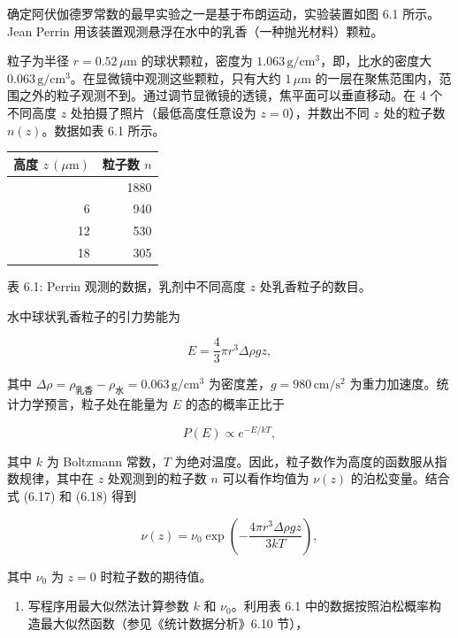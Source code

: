 \begin{question}
确定阿伏伽德罗常数的最早实验之一是基于布朗运动，实验装置如图 6.1
所示。Jean Perrin 用该装置观测悬浮在水中的乳香（一种抛光材料）颗粒。


粒子为半径 \(r=0.52\,\mu\mathrm{m}\) 的球状颗粒，密度为
\(1.063\,\mathrm{g/cm^3}\)，即，比水的密度大
\(0.063\,\mathrm{g/cm^3}\)。在显微镜中观测这些颗粒，只有大约
\(1\,\mu\mathrm{m}\)
的一层在聚焦范围内，范围之外的粒子观测不到。通过调节显微镜的透镜，焦平面可以垂直移动。在
4 个不同高度 \(z\) 处拍摄了照片（最低高度任意设为 \(z=0\)），并数出不同
\(z\) 处的粒子数 \(n(z)\)。数据如表 6.1 所示。

{%
\begin{longtable}[]{@{}rr@{}}
\toprule\noalign{}
高度 \(z\,(\mu\mathrm{m})\) & 粒子数 \(n\) \\
\midrule\noalign{}
\endhead
\bottomrule\noalign{}
\endlastfoot
0 & 1880 \\
6 & 940 \\
12 & 530 \\
18 & 305 \\
\end{longtable}
}

表 6.1: Perrin 观测的数据，乳剂中不同高度 \(z\) 处乳香粒子的数目。

水中球状乳香粒子的引力势能为

\[
E=\frac43\pi r^3\Delta\rho gz,
\]

其中 \(\Delta\rho=\rho_{\text{乳香}}-\rho_{\text{水}}=0.063\,\mathrm{g/cm^3}\)
为密度差，\(g=980\,\mathrm{cm/s^2}\)
为重力加速度。统计力学预言，粒子处在能量为 \(E\) 的态的概率正比于

\[
P(E)\propto e^{-E/kT},
\]

其中 \(k\) 为 Boltzmann 常数，\(T\)
为绝对温度。因此，粒子数作为高度的函数服从指数规律，其中在 \(z\)
处观测到的粒子数 \(n\) 可以看作均值为 \(\nu(z)\) 的泊松变量。结合式
(6.17) 和 (6.18) 得到

\[
\nu(z)=\nu_0\exp\left(-\frac{4\pi r^3\Delta\rho gz}{3kT}\right),
\]

其中 \(\nu_0\) 为 \(z=0\) 时粒子数的期待值。

\begin{enumerate}
\item
  写程序用最大似然法计算参数 \(k\) 和 \(\nu_0\)。利用表 6.1
  中的数据按照泊松概率构造最大似然函数（参见《统计数据分析》6.10 节），
\end{enumerate}


\end{question}
